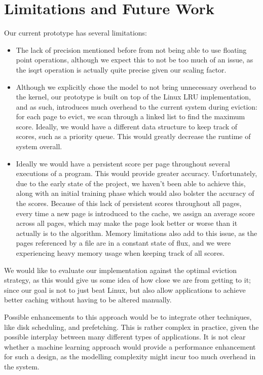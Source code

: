 \section{Limitations and Future Work}
Our current prototype has several limitations:
\begin{itemize}
	
\item
The lack of precision mentioned before from not being able to use floating point operations, although we expect this to not be too much of an issue, as the isqrt operation is actually quite precise given our scaling factor.

\item
Although we explicitly chose the model to not bring unnecessary overhead to the kernel, our prototype is built on top of the Linux LRU implementation, and as such, introduces much overhead to the current system during eviction: for each page to evict, we scan through a linked list to find the maximum score. Ideally, we would have a different data structure to keep track of scores, such as a priority queue. This would greatly decrease the runtime of system overall.  

\item
Ideally we would have a persistent score per page throughout several executions of a program. This would provide greater accuracy. Unfortunately, due to the early state of the project, we haven't been able to achieve this, along with an initial training phase which would also bolster the accuracy of the scores. Because of this lack of persistent scores throughout all pages, every time a new page is introduced to the cache, we assign an average score across all pages, which may make the page look better or worse than it actually is to the algorithm. Memory limitations also add to this issue, as the pages referenced by a file are in a constant state of flux, and we were experiencing heavy memory usage when keeping track of all scores.

\end{itemize}
We would like to evaluate our implementation against the optimal eviction strategy, as this would give us some idea of how close we are from getting to it; since our goal is not to just beat Linux, but also allow applications to achieve better caching without having to be altered manually.

Possible enhancements to this approach would be to integrate other techniques,
like disk scheduling, and prefetching.  This is rather complex in practice,
given the possible interplay between many different types of applications.  It
is not clear whether a machine learning approach would provide a performance
enhancement for such a design, as the modelling complexity might incur too much
overhead in the system.